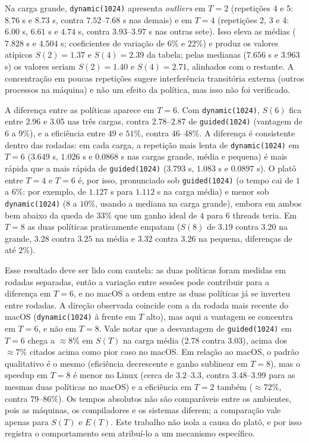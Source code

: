 \documentclass[12pt,a4paper]{article}
\begin{document}
Na carga grande, \texttt{dynamic(1024)} apresenta \emph{outliers} em
$T=2$ (repetições 4 e 5: $8.76$ s e $8.73$ s, contra $7.52$--$7.68$ s nas
demais) e em $T=4$ (repetições 2, 3 e 4: $6.00$ s, $6.61$ s e $4.74$ s,
contra $3.93$--$3.97$ s nas outras sete). Isso eleva as médias ($7.828$ s e
$4.504$ s; coeficientes de variação de $6\%$ e $22\%$) e produz os
valores atípicos $S(2)=1.37$ e $S(4)=2.39$ da tabela; pelas medianas
($7.656$ s e $3.963$ s) os valores seriam $S(2)=1.40$ e $S(4)=2.71$,
alinhados com o restante. A concentração em poucas repetições sugere
interferência transitória externa (outros processos na máquina) e não um
efeito da política, mas isso não foi verificado.

A diferença entre as políticas aparece em $T=6$. Com
\texttt{dynamic(1024)}, $S(6)$ fica entre $2.96$ e $3.05$ nas três
cargas, contra $2.78$--$2.87$ de \texttt{guided(1024)} (vantagem de
$6$ a $9\%$), e a eficiência entre $49$ e $51\%$, contra $46$--$48\%$. A
diferença é consistente dentro das rodadas: em cada carga, a repetição
mais lenta de \texttt{dynamic(1024)} em $T=6$ ($3.649$ s, $1.026$ s e
$0.0868$ s nas cargas grande, média e pequena) é mais rápida que a mais
rápida de \texttt{guided(1024)} ($3.793$ s, $1.083$ s e $0.0897$ s). O
platô entre $T=4$ e $T=6$ é, por isso, pronunciado sob
\texttt{guided(1024)} (o tempo cai de $1$ a $6\%$: por exemplo, de
$1.127$ s para $1.112$ s na carga média) e menor sob
\texttt{dynamic(1024)} ($8$ a $10\%$, usando a mediana na carga grande),
embora em ambos bem abaixo da queda de $33\%$ que um ganho ideal de $4$
para $6$ threads teria. Em $T=8$ as duas políticas praticamente
empatam ($S(8)$ de $3.19$ contra $3.20$ na grande, $3.28$ contra $3.25$
na média e $3.32$ contra $3.26$ na pequena, diferenças de até $2\%$).

Esse resultado deve ser lido com cautela: as duas políticas foram
medidas em rodadas separadas, então a variação entre sessões pode contribuir para a diferença em $T=6$, e no macOS a ordem
entre as duas políticas já se inverteu entre rodadas. A direção observada
coincide com a da rodada mais recente do macOS (\texttt{dynamic(1024)} à
frente em $T$ alto), mas aqui a vantagem se concentra em $T=6$, e não
em $T=8$. Vale notar que a desvantagem de \texttt{guided(1024)} em
$T=6$ chega a $\approx\!8\%$ em $S(T)$ na carga média ($2.78$ contra
$3.03$), acima dos $\approx\!7\%$ citados acima como pior caso no macOS.
Em relação ao macOS, o padrão qualitativo é o mesmo (eficiência
decrescente e ganho sublinear em $T=8$), mas o speedup em $T=8$ é menor
no Linux (cerca de $3.2$--$3.3$, contra $3.48$--$3.99$ para as mesmas
duas políticas no macOS) e a eficiência em $T=2$ também ($\approx\!72\%$,
contra $79$--$86\%$). Os tempos absolutos não são comparáveis entre os
ambientes, pois as máquinas, os compiladores e os sistemas diferem; a
comparação vale apenas para $S(T)$ e $E(T)$. Este trabalho não isola a
causa do platô, e por isso registra
o comportamento sem atribuí-lo a um mecanismo específico.
\end{document}
